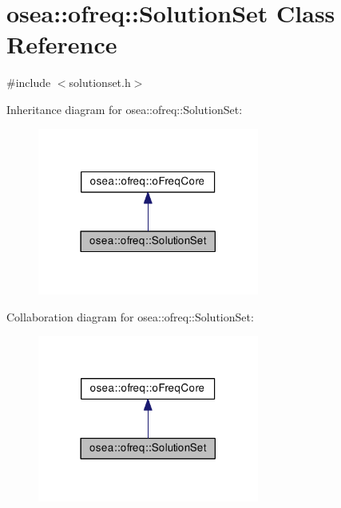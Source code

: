 \hypertarget{classosea_1_1ofreq_1_1_solution_set}{\section{osea\-:\-:ofreq\-:\-:Solution\-Set Class Reference}
\label{classosea_1_1ofreq_1_1_solution_set}
}


{\ttfamily \#include $<$solutionset.\-h$>$}



Inheritance diagram for osea\-:\-:ofreq\-:\-:Solution\-Set\-:
\nopagebreak
\begin{figure}[H]
\begin{center}
\leavevmode
\includegraphics[width=206pt]{classosea_1_1ofreq_1_1_solution_set__inherit__graph}
\end{center}
\end{figure}


Collaboration diagram for osea\-:\-:ofreq\-:\-:Solution\-Set\-:
\nopagebreak
\begin{figure}[H]
\begin{center}
\leavevmode
\includegraphics[width=206pt]{classosea_1_1ofreq_1_1_solution_set__coll__graph}
\end{center}
\end{figure}

